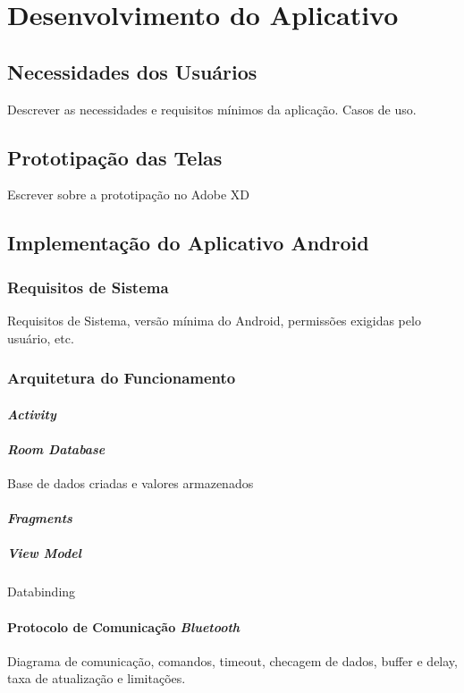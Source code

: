 \chapter{Desenvolvimento do Aplicativo}

\section{Necessidades dos Usuários}

Descrever as necessidades e requisitos mínimos da aplicação. Casos de uso.

\section{Prototipação das Telas}

Escrever sobre a prototipação no Adobe XD

\section{Implementação do Aplicativo Android}

\subsection{Requisitos de Sistema}

Requisitos de Sistema, versão mínima do Android, permissões exigidas pelo usuário, etc.

\subsection{Arquitetura do Funcionamento}

\subsubsection{\textit{Activity}}
\subsubsection{\textit{Room Database}}

Base de dados criadas e valores armazenados


\subsubsection{\textit{Fragments}}

\paragraph{\textit{View Model}}

Databinding

\subsubsection{Protocolo de Comunicação \textit{Bluetooth}}

Diagrama de comunicação, comandos, timeout, checagem de dados, buffer e delay, taxa de atualização e limitações.